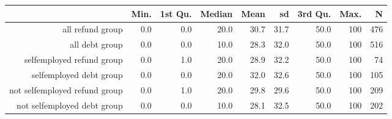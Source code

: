 \begin{table}[ht]
\centering
\begin{tabular}{rrrrrrrrr}
  \hline
 & Min. & 1st Qu. & Median & Mean & sd & 3rd Qu. & Max. & N \\ 
  \hline
all refund group & 0.0 & 0.0 & 20.0 & 30.7 & 31.7 & 50.0 & 100 & 476 \\ 
  all debt group & 0.0 & 0.0 & 10.0 & 28.3 & 32.0 & 50.0 & 100 & 516 \\ 
  selfemployed refund group & 0.0 & 1.0 & 20.0 & 28.9 & 32.2 & 50.0 & 100 & 74 \\ 
  selfemployed debt group & 0.0 & 0.0 & 20.0 & 32.0 & 32.6 & 50.0 & 100 & 105 \\ 
  not selfemployed refund group & 0.0 & 1.0 & 20.0 & 29.8 & 29.6 & 50.0 & 100 & 209 \\ 
  not selfemployed debt group & 0.0 & 0.0 & 10.0 & 28.1 & 32.5 & 50.0 & 100 & 202 \\ 
   \hline
\end{tabular}
\end{table}
